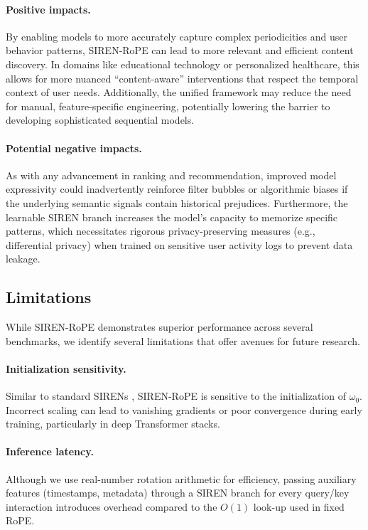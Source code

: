 \documentclass{article}
\begin{document}
\paragraph{Positive impacts.}
By enabling models to more accurately capture complex periodicities and user behavior
patterns, SIREN-RoPE can lead to more relevant and efficient content discovery. In
domains like educational technology or personalized healthcare, this allows for more
nuanced ``content-aware'' interventions that respect the temporal context of user needs.
Additionally, the unified framework may reduce the need for manual, feature-specific
engineering, potentially lowering the barrier to developing sophisticated sequential
models.

\paragraph{Potential negative impacts.}
As with any advancement in ranking and recommendation, improved model expressivity
could inadvertently reinforce filter bubbles or algorithmic biases if the underlying
semantic signals contain historical prejudices. Furthermore, the learnable SIREN branch
increases the model's capacity to memorize specific patterns, which necessitates
rigorous privacy-preserving measures (e.g., differential privacy) when trained on
sensitive user activity logs to prevent data leakage.

\subsection{Limitations}

While SIREN-RoPE demonstrates superior performance across several benchmarks, we
identify several limitations that offer avenues for future research.

\paragraph{Initialization sensitivity.}
Similar to standard SIRENs \citep{sitzmann2020siren}, SIREN-RoPE is sensitive to the
initialization of $\omega_0$. Incorrect scaling can lead to vanishing gradients or
poor convergence during early training, particularly in deep Transformer stacks.

\paragraph{Inference latency.}
Although we use real-number rotation arithmetic for efficiency, passing auxiliary
features (timestamps, metadata) through a SIREN branch for every query/key interaction
introduces overhead compared to the $O(1)$ look-up used in fixed RoPE.
\end{document}
